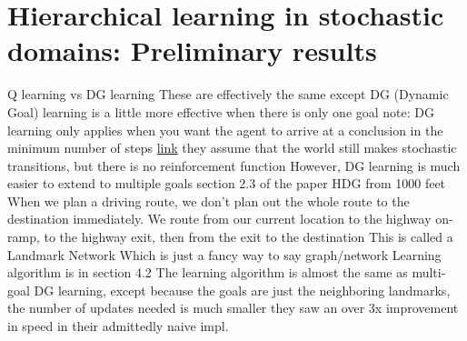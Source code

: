 \section{Hierarchical learning in stochastic domains: Preliminary results}

\begin{outline}
\1 Q learning vs DG learning
\2 These are effectively the same except DG (Dynamic Goal) learning is a little more effective when there is only one goal
\3 note: DG learning only applies when you want the agent to arrive at a conclusion in the minimum number of steps \href{http://people.csail.mit.edu/lpk/papers/ijcai93.ps}{link}
\3 they assume that the world still makes stochastic transitions, but there is no reinforcement function
\2 However, DG learning is much easier to extend to multiple goals
\3 section 2.3 of the paper
\1 HDG from 1000 feet
\2 When we plan a driving route, we don't plan out the whole route to the destination immediately. We route from our current location to the highway on-ramp, to the highway exit, then from the exit to the destination
\2 This is called a Landmark Network
\3 Which is just a fancy way to say graph/network
\2 Learning algorithm is in section 4.2
\3 The learning algorithm is almost the same as multi-goal DG learning, except because the goals are just the neighboring landmarks, the number of updates needed is much smaller
\2 they saw an over 3x improvement in speed in their admittedly naive impl.
\end{outline}